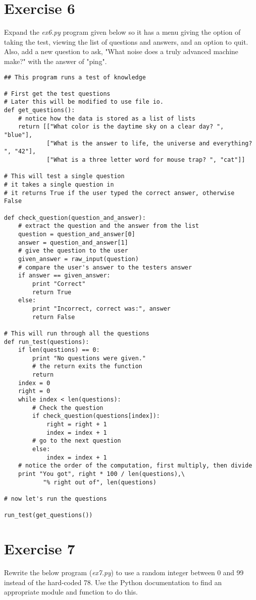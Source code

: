 \documentclass[11pt,a4paper]{article}
\begin{document}
\section*{Exercise 6}
Expand the {\it ex6.py} program given below so it has a menu giving
the option of taking the test, viewing the list of questions and
answers, and an option to quit. Also, add a new question to ask, "What
noise does a truly advanced machine make?" with the answer of "ping".

\begin{verbatim}
## This program runs a test of knowledge
 
# First get the test questions
# Later this will be modified to use file io.
def get_questions():
    # notice how the data is stored as a list of lists
    return [["What color is the daytime sky on a clear day? ", "blue"],
            ["What is the answer to life, the universe and everything? ", "42"],
            ["What is a three letter word for mouse trap? ", "cat"]]
 
# This will test a single question
# it takes a single question in
# it returns True if the user typed the correct answer, otherwise False
 
def check_question(question_and_answer):
    # extract the question and the answer from the list
    question = question_and_answer[0]
    answer = question_and_answer[1]
    # give the question to the user
    given_answer = raw_input(question)
    # compare the user's answer to the testers answer
    if answer == given_answer:
        print "Correct"
        return True
    else:
        print "Incorrect, correct was:", answer
        return False
 
# This will run through all the questions
def run_test(questions):
    if len(questions) == 0:
        print "No questions were given."
        # the return exits the function
        return
    index = 0
    right = 0
    while index < len(questions):
        # Check the question
        if check_question(questions[index]):
            right = right + 1
            index = index + 1
        # go to the next question
        else:
            index = index + 1
    # notice the order of the computation, first multiply, then divide
    print "You got", right * 100 / len(questions),\
           "% right out of", len(questions)
 
# now let's run the questions
 
run_test(get_questions())
\end{verbatim}

\section*{Exercise 7}
Rewrite the below program ({\it ex7.py}) to use a random integer
between 0 and 99 instead of the hard-coded 78.  Use the Python
documentation to find an appropriate module and function to do this.
\end{document}
